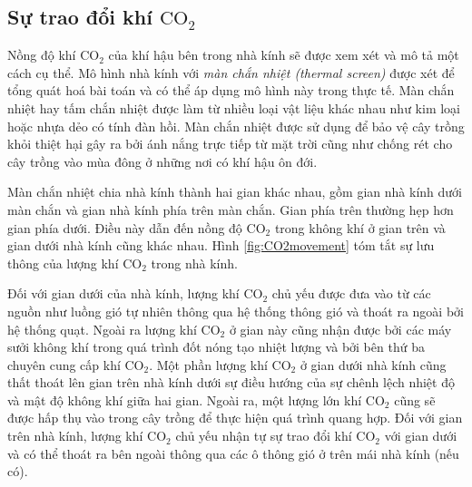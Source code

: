 \documentclass[a4paper]{article}
\begin{document}
\subsection{Sự trao đổi khí $\mathrm{CO_{2}}$}
Nồng độ khí $\mathrm{CO_2}$ của khí hậu bên trong nhà kính sẽ được xem xét và mô tả một cách cụ thể. Mô hình nhà kính với \emph{màn chắn nhiệt (thermal screen)} được xét để tổng quát hoá bài toán và có thể áp dụng mô hình này trong thực tế. Màn chắn nhiệt hay tấm chắn nhiệt được làm từ nhiều loại vật liệu khác nhau như kim loại hoặc nhựa dẻo có tính đàn hồi. Màn chắn nhiệt được sử dụng để bảo vệ cây trồng khỏi thiệt hại gây ra bởi ánh nắng trực tiếp từ mặt trời cũng như chống rét cho cây trồng vào mùa đông ở những nơi có khí hậu ôn đới.
\par
Màn chắn nhiệt chia nhà kính thành hai gian khác nhau, gồm gian nhà kính dưới màn chắn và gian nhà kính phía trên màn chắn. Gian phía trên thường hẹp hơn gian phía dưới. Điều này dẫn đến nồng độ $\mathrm{CO_2}$ trong không khí ở gian trên và gian dưới nhà kính cũng khác nhau. Hình \ref{fig:CO2movement} tóm tắt sự lưu thông của lượng khí $\mathrm{CO_2}$ trong nhà kính. 
\par
Đối với gian dưới của nhà kính, lượng khí $\mathrm{CO_2}$ chủ yếu được đưa vào từ các nguồn như luồng gió tự nhiên thông qua hệ thống thông gió và thoát ra ngoài bởi hệ thống quạt. Ngoài ra lượng khí $\mathrm{CO_2}$ ở gian này cũng nhận được bởi các máy sưởi không khí trong quá trình đốt nóng tạo nhiệt lượng và bởi bên thứ ba chuyên cung cấp khí $\mathrm{CO_2}$. Một phần lượng khí $\mathrm{CO_2}$ ở gian dưới nhà kính cũng thất thoát lên gian trên nhà kính dưới sự điều hướng của sự chênh lệch nhiệt độ và mật độ không khí giữa hai gian. Ngoài ra, một lượng lớn khí $\mathrm{CO_2}$ cũng sẽ được hấp thụ vào trong cây trồng để thực hiện quá trình quang hợp. Đối với gian trên nhà kính, lượng khí $\mathrm{CO_2}$ chủ yếu nhận tự sự trao đổi khí $\mathrm{CO_2}$ với gian dưới và có thể thoát ra bên ngoài thông qua các ô thông gió ở trên mái nhà kính (nếu có).
\end{document}
